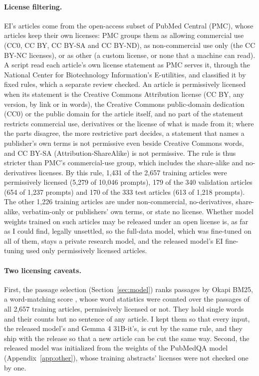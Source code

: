 \documentclass[11pt,letterpaper]{article}
\begin{document}
\paragraph{License filtering.} EI's articles come from the open-access subset of PubMed Central (PMC), whose articles keep their own licenses: PMC groups them as allowing commercial use (CC0, CC BY, CC BY-SA and CC BY-ND), as non-commercial use only (the CC BY-NC licenses), or as other (a custom license, or none that a machine can read). A script read each article's own license statement as PMC serves it, through the National Center for Biotechnology Information's E-utilities, and classified it by fixed rules, which a separate review checked. An article is permissively licensed when its statement is the Creative Commons Attribution license (CC BY, any version, by link or in words), the Creative Commons public-domain dedication (CC0) or the public domain for the article itself, and no part of the statement restricts commercial use, derivatives or the license of what is made from it; where the parts disagree, the more restrictive part decides, a statement that names a publisher's own terms is not permissive even beside Creative Commons words, and CC BY-SA (Attribution-ShareAlike) is not permissive. The rule is thus stricter than PMC's commercial-use group, which includes the share-alike and no-derivatives licenses. By this rule, 1,431 of the 2,657 training articles were permissively licensed (5,279 of 10,046 prompts), 179 of the 340 validation articles (654 of 1,237 prompts) and 170 of the 333 test articles (613 of 1,218 prompts). The other 1,226 training articles are under non-commercial, no-derivatives, share-alike, verbatim-only or publishers' own terms, or state no license. Whether model weights trained on such articles may be released under an open license is, as far as I could find, legally unsettled, so the full-data model, which was fine-tuned on all of them, stays a private research model, and the released model's EI fine-tuning used only permissively licensed articles.

\paragraph{Two licensing caveats.} First, the passage selection (Section~\ref{sec:model}) ranks passages by Okapi BM25, a word-matching score \citep{robertson2009}, whose word statistics were counted over the passages of all 2,657 training articles, permissively licensed or not. They hold single words and their counts but no sentence of any article. I kept them so that every input, the released model's and Gemma 4 31B-it's, is cut by the same rule, and they ship with the release so that a new article can be cut the same way. Second, the released model was initialized from the weights of the PubMedQA model (Appendix~\ref{app:other}), whose training abstracts' licenses were not checked one by one.
\end{document}
